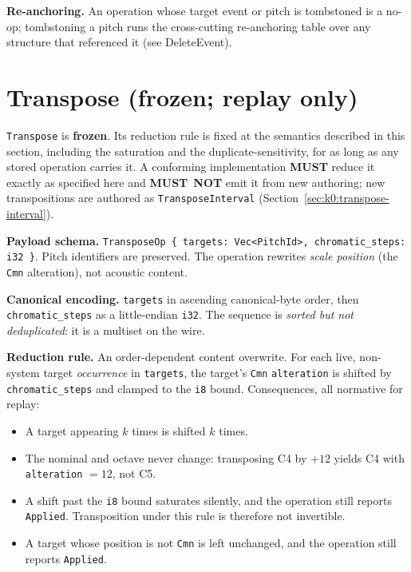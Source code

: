 \documentclass[11pt,letterpaper]{report}
\newcounter{requirement}[chapter]
\newcommand{\MUST}{\textbf{MUST}}
\newcommand{\MUSTNOT}{\textbf{MUST}\nobreak\ \textbf{NOT}}
\begin{document}
\textbf{Re-anchoring.} An operation whose target event or pitch is tombstoned is
a no-op; tombstoning a pitch runs the cross-cutting re-anchoring table over any
structure that referenced it (see DeleteEvent).

\section{Transpose (frozen; replay only)}
\label{sec:k0:transpose}

\begin{requirement}
  \label{req:opcat:transpose-frozen}
  \texttt{Transpose} is \textbf{frozen}. Its reduction rule is fixed at the
  semantics described in this section, including the saturation and the
  duplicate-sensitivity, for as long as any stored operation carries it. A
  conforming implementation \MUST{} reduce it exactly as specified here and
  \MUSTNOT{} emit it from new authoring; new transpositions are authored as
  \texttt{TransposeInterval} (Section~\ref{sec:k0:transpose-interval}).
\end{requirement}

\textbf{Payload schema.} \texttt{TransposeOp \{ targets: Vec<PitchId>,
chromatic\_steps: i32 \}}. Pitch identifiers are preserved. The operation
rewrites \emph{scale position} (the \texttt{Cmn} alteration), not acoustic
content.

\textbf{Canonical encoding.} \texttt{targets} in ascending canonical-byte order,
then \texttt{chromatic\_steps} as a little-endian \texttt{i32}. The sequence is
\emph{sorted but not deduplicated}: it is a multiset on the wire.

\textbf{Reduction rule.} An order-dependent content overwrite. For each live,
non-system target \emph{occurrence} in \texttt{targets}, the target's \texttt{Cmn}
\texttt{alteration} is shifted by \texttt{chromatic\_steps} and clamped to the
\texttt{i8} bound. Consequences, all normative for replay:

\begin{itemize}
  \item A target appearing $k$ times is shifted $k$ times.
  \item The nominal and octave never change: transposing C4 by $+12$ yields C4
    with \texttt{alteration} $= 12$, not C5.
  \item A shift past the \texttt{i8} bound saturates silently, and the operation
    still reports \texttt{Applied}. Transposition under this rule is therefore
    not invertible.
  \item A target whose position is not \texttt{Cmn} is left unchanged, and the
    operation still reports \texttt{Applied}.
\end{itemize}
\end{document}

